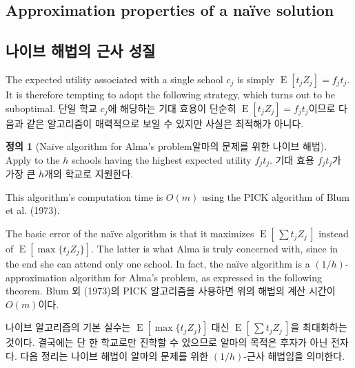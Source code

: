 \documentclass[11pt]{article} %
\theoremstyle{definition}
\newtheorem{definition}{Definition}
\theoremstyle{definition}
\newtheorem{definition}{정의}
\begin{document}
\ifen \subsection{Approximation properties of a na\"ive solution}  \else \subsection{나이브 해법의 근사 성질} \fi
\ifen
The expected utility associated with a single school $c_j$ is simply $\operatorname{E}[t_j Z_j] = f_j t_j$. It is therefore tempting to adopt the following strategy, which turns out to be suboptimal.
\else 
단일 학교 $c_j$에 해당하는 기대 효용이 단순히 $\operatorname{E}[t_j Z_j] = f_j t_j$이므로 다음과 같은 알고리즘이 매력적으로 보일 수 있지만 사실은 최적해가 아니다.
\fi
\begin{definition}[\ifen Na\"ive algorithm for Alma’s problem\else 알마의 문제를 위한 나이브 해법\fi] \label{naivealgorithm}
\ifen 
Apply to the $h$ schools having the highest expected utility $f_j t_j$.
\else
기대 효용 $f_j t_j$가 가장 큰 $h$개의 학교로 지원한다.
\fi
\end{definition}
\ifen 
\noindent This algorithm's computation time is $O(m)$ using the PICK algorithm of Blum et al. (1973).

The basic error of the na\"ive algorithm is that it maximizes $\operatorname{E}\left[\,\sum t_j Z_j\, \right]$ instead of $\operatorname{E}\left[\max \{t_j Z_j\} \right]$. The latter is what Alma is truly concerned with, since in the end she can attend only one school. In fact, the na\"ive algorithm is a $(1/h)$-approximation algorithm for Alma’s problem, as expressed in the following theorem.
\else
\noindent Blum 외 (1973)의 PICK 알고리즘을 사용하면 위의 해법의 계산 시간이 $O(m)$이다.

나이브 알고리즘의 기본 실수는 $\operatorname{E}\left[\max \{t_j Z_j\} \right]$ 대신  $\operatorname{E}\left[\,\sum t_j Z_j\,\right]$을 최대화하는 것이다. 결국에는 단 한 학교로만 진학할 수 있으므로 알마의 목적은 후자가 아닌 전자다. 다음 정리는 나이브 해법이 알마의 문제를 위한 $(1/h)$-근사 해법임을 의미한다.
\fi
\end{document}
